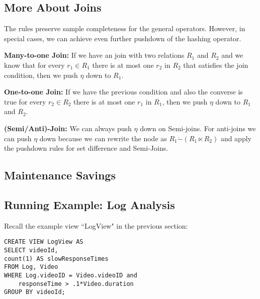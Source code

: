 \subsection{More About Joins}
The rules preserve sample completeness for the general operators. 
However, in special cases, we can achieve even further pushdown of the hashing operator. 

\textbf{Many-to-one Join: } If we have an join with two relations $R_1$ and $R_2$ and we know that for every $r_1 \in R_1$ there is at most one $r_2$ in $R_2$ that satisfies the join condition, then we push $\eta$ down to $R_1$.

\textbf{One-to-one Join: } If we have the previous condition and also the converse is true for every $r_2 \in R_2$ there is at most one $r_1$ in $R_1$, then we push $\eta$ down to $R_1$ and $R_2$.

\textbf{(Semi/Anti)-Join: } We can always push $\eta$ down on Semi-joins. For anti-joins we can push $\eta$ down because we can rewrite the node as $R_1 \dot{-} (R_1 \ltimes R_2) $ and apply the pushdown rules for set difference and Semi-Joins.

\subsection{Maintenance Savings}

\subsection{Running Example: Log Analysis}
Recall the example view ``LogView" in the previous section:
\begin{lstlisting} 
CREATE VIEW LogView AS 
SELECT videoId, 
count(1) AS slowResponseTimes 
FROM Log, Video
WHERE Log.videoID = Video.videoID and
    responseTime > .1*Video.duration
GROUP BY videoId;
\end{lstlisting}


